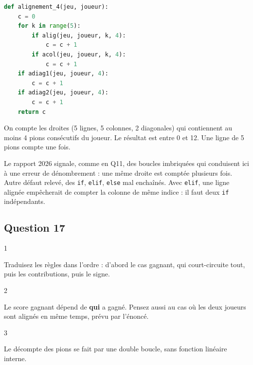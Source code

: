 \documentclass[11pt,a4paper]{article}
\begin{document}
\begin{lstlisting}[language=Python]
def alignement_4(jeu, joueur):
    c = 0
    for k in range(5):
        if alig(jeu, joueur, k, 4):
            c = c + 1
        if acol(jeu, joueur, k, 4):
            c = c + 1
    if adiag1(jeu, joueur, 4):
        c = c + 1
    if adiag2(jeu, joueur, 4):
        c = c + 1
    return c
\end{lstlisting}

On compte les droites (5 lignes, 5 colonnes, 2 diagonales) qui contiennent au moins 4 pions consécutifs du joueur. Le résultat est entre 0 et 12. Une ligne de 5 pions compte une fois.

\begin{piege}

Le rapport 2026 signale, comme en Q11, des boucles imbriquées qui conduisent ici à une erreur de dénombrement : une même droite est comptée plusieurs fois. Autre défaut relevé, des \texttt{if}, \texttt{elif}, \texttt{else} mal enchaînés. Avec \texttt{elif}, une ligne alignée empêcherait de compter la colonne de même indice : il faut deux \texttt{if} indépendants.

\end{piege}

\hypertarget{question-17}{%
\subsection{Question 17}\label{question-17}}

\begin{indication}{1}

Traduisez les règles dans l'ordre : d'abord le cas gagnant, qui court-circuite tout, puis les contributions, puis le signe.

\end{indication}

\begin{indication}{2}

Le score gagnant dépend de \textbf{qui} a gagné. Pensez aussi au cas où les deux joueurs sont alignés en même temps, prévu par l'énoncé.

\end{indication}

\begin{indication}{3}

Le décompte des pions se fait par une double boucle, sans fonction linéaire interne.

\end{indication}
\end{document}
